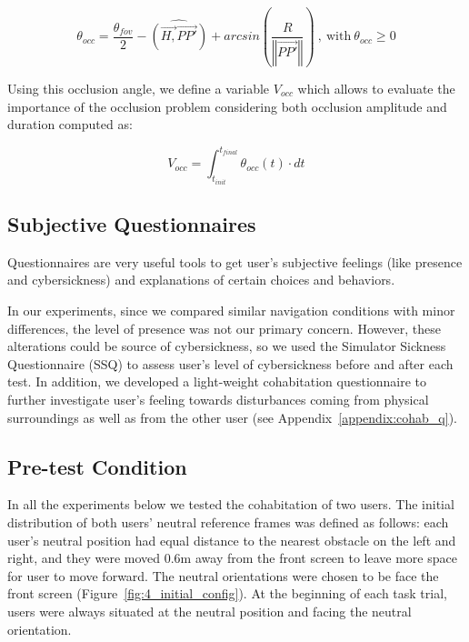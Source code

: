 \begin{equation}
\theta_{occ}=\frac{\theta_{fov}}{2}-\widehat{(\overrightarrow{H,}\overrightarrow{PP'})}+arcsin(\frac{R}{\left\Vert \overrightarrow{PP'}\right\Vert })\mathrm{\:,\: with\:}\theta_{occ}\geq0
\end{equation}

Using this occlusion angle, we define a variable $V_{occ}$ which allows to evaluate the importance of the occlusion problem considering both occlusion amplitude and duration computed as:

\begin{equation}
V_{occ}=\int_{t_{init}}^{t_{final}}\theta_{occ}(t)\cdot dt
\end{equation}


\subsection{Subjective Questionnaires}
Questionnaires are very useful tools to get user's subjective feelings (like presence and cybersickness) and explanations of certain choices and behaviors.

In our experiments, since we compared similar navigation conditions with minor differences, the level of presence was not our primary concern. However, these alterations could be source of cybersickness, so we used the Simulator Sickness Questionnaire (SSQ) \cite{Kennedy1993SSQ} to assess user's level of cybersickness before and after each test. In addition, we developed a light-weight cohabitation questionnaire to further investigate user's feeling towards disturbances coming from physical surroundings as well as from the other user (see Appendix~\ref{appendix:cohab_q}).

\subsection{Pre-test Condition}
In all the experiments below we tested the cohabitation of two users. The initial distribution of both users' neutral reference frames was defined as follows: each user's neutral position had equal distance to the nearest obstacle on the left and right, and they were moved 0.6m away from the front screen to leave more space for user to move forward. The neutral orientations were chosen to be face the front screen (Figure~\ref{fig:4_initial_config}). At the beginning of each task trial, users were always situated at the neutral position and facing the neutral orientation.

